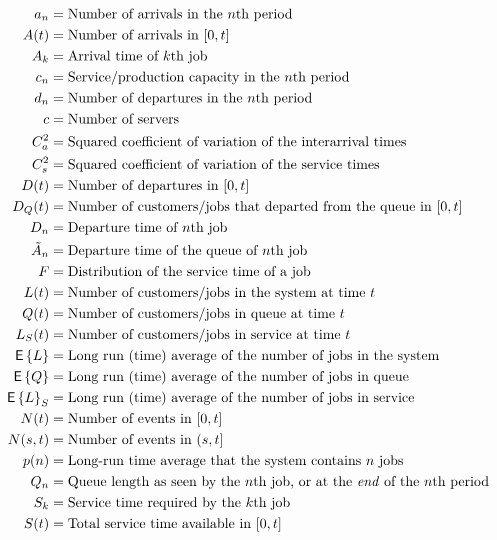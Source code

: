 \begin{align*}
  a_n &= \text{Number of arrivals in the $n$th period} \\
  A(t) &= \text{Number of arrivals in $[0,t]$} \\
  A_k &= \text{Arrival time of $k$th job} \\
  c_n &= \text{Service/production capacity in the $n$th period} \\
  d_n &= \text{Number of departures in the $n$th period} \\
  c &= \text{Number of servers} \\
  C_a^2 &= \text{Squared coefficient of variation of the interarrival times} \\
  C_s^2 &= \text{Squared coefficient of variation of the service times} \\
  D(t) &= \text{Number of departures in $[0,t]$} \\
  D_Q(t) &= \text{Number of customers/jobs that departed from the queue in $[0,t]$} \\
  D_n &= \text{Departure time of $n$th job} \\
  \tilde A_{n} &= \text{Departure time of the queue of $n$th job} \\
  F &= \text{Distribution of the service time of a job} \\
  L(t) &= \text{Number of customers/jobs in the system at time $t$} \\
  Q(t) &= \text{Number of customers/jobs in queue at time $t$} \\
  L_S(t) &= \text{Number of customers/jobs in service at time $t$} \\
  \E L &= \text{Long run (time) average of the number of jobs in the system} \\
  \E Q &= \text{Long run (time) average of the number of jobs in queue} \\
  \E L_S &= \text{Long run (time) average of the number of jobs in service} \\
  N(t) &= \text{Number of events in $[0,t]$} \\
  N(s,t) &= \text{Number of events in $(s,t]$} \\
  p(n)  &= \text{Long-run time average that the system contains $n$ jobs} \\
  Q_n &= \text{Queue length as seen by the $n$th job, or at the \textit{end} of the $n$th period} \\
  S_k &= \text{Service time required by the $k$th job} \\
  S(t) &= \text{Total service time available in $[0,t]$} \\

\end{align*}
